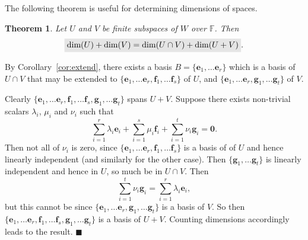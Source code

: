 \documentclass[letter-paper]{tufte-book}
\newtheorem{theorem}{\color{pastel-blue}Theorem}[section]
\newenvironment{proof}[1][Proof]{\begin{trivlist}
\item[\hskip \labelsep {\bfseries #1}]}{\end{trivlist}}
\newcommand{\Ob}{{\boldsymbol{0}}}
\newcommand{\eb}{{\boldsymbol{e}}}
\newcommand{\qed}{\hfill$\blacksquare$}
\newcommand{\highlight}[1]{\mathchoice%
  {\colorbox{black!10}{$\displaystyle#1$}}%
  {\colorbox{black!10}{$\textstyle#1$}}%
  {\colorbox{black!10}{$\scriptstyle#1$}}%
  {\colorbox{black!10}{$\scriptscriptstyle#1$}}}%
\begin{document}
The following theorem is useful for determining dimensions of spaces.

\begin{theorem}\label{thm:subspace_dim}
  Let $U$ and $V$ be finite subspaces of $W$ over $\mathbb{F}$. Then
  \begin{equation}
    \highlight{\mbox{dim}(U) + \mbox{dim}(V) = \mbox{dim}(U \cap V) + \mbox{dim}(U+V)}.
  \end{equation}
\end{theorem}

\begin{proof}
  By Corollary~\ref{cor:extend}, there exists a basis $B=\{\eb_1, \ldots \eb_r\}$ which is a basis of $U \cap V$ that may be extended to $\{\eb_1, \ldots \eb_r, \boldsymbol{f}_1, \ldots \boldsymbol{f}_s\}$ of $U$, and $\{\eb_1, \ldots \eb_r, \boldsymbol{g}_1, \ldots \boldsymbol{g}_t\}$ of $V$.
  
  Clearly $\{\eb_1, \ldots \eb_r, \boldsymbol{f}_1, \ldots \boldsymbol{f}_s, \boldsymbol{g}_1, \ldots \boldsymbol{g}_t\}$ spans $U+V$. Suppose there exists non-trivial scalars $\lambda_i$, $\mu_i$ and $\nu_i$ such that
  \begin{equation*}
    \sum_{i=1}^r \lambda_i\eb_i + \sum_{i=1}^s \mu_i\boldsymbol{f}_i + \sum_{i=1}^t \nu_i\boldsymbol{g}_i = \Ob.
  \end{equation*}
  Then not all of $\nu_i$ is zero, since $\{\eb_1, \ldots \eb_r, \boldsymbol{f}_1, \ldots \boldsymbol{f}_s\}$ is a basis of of $U$ and hence linearly independent (and similarly for the other case). Then $\{\boldsymbol{g}_1, \ldots \boldsymbol{g}_t\}$ is linearly independent and hence in $U$, so much be in $U \cap V$. Then
  \begin{equation*}
    \sum_{i=1}^t \nu_i\boldsymbol{g}_i = \sum_{i=1}^r \lambda_i\eb_i,
  \end{equation*}
  but this cannot be since $\{\eb_1, \ldots \eb_r, \boldsymbol{g}_1, \ldots \boldsymbol{g}_t\}$ is a basis of $V$. So then $\{\eb_1, \ldots \eb_r, \boldsymbol{f}_1, \ldots \boldsymbol{f}_s, \boldsymbol{g}_1, \ldots \boldsymbol{g}_t\}$ is a basis of $U+V$. Counting dimensions accordingly leads to the result. \qed
\end{proof}
\end{document}
